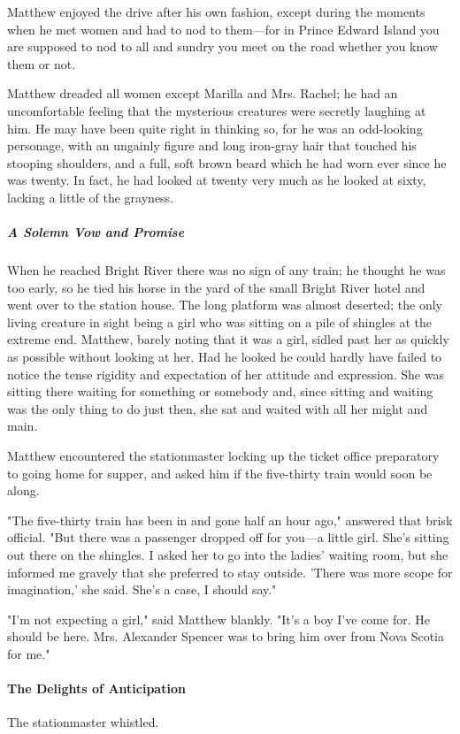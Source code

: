\documentclass{article}
\begin{document}
Matthew enjoyed the drive after his own fashion, except during the moments when he met women and had to nod to them---for in Prince Edward Island you are supposed to nod to all and sundry you meet on the road whether you know them or not.

Matthew dreaded all women except Marilla and Mrs. Rachel; he had an uncomfortable feeling that the mysterious creatures were secretly laughing at him. He may have been quite right in thinking so, for he was an odd-looking personage, with an ungainly figure and long iron-gray hair that touched his stooping shoulders, and a full, soft brown beard which he had worn ever since he was twenty. In fact, he had looked at twenty very much as he looked at sixty, lacking a little of the grayness.

\subparagraph{A Solemn Vow and Promise}
When he reached Bright River there was no sign of any train; he thought he was too early, so he tied his horse in the yard of the small Bright River hotel and went over to the station house. The long platform was almost deserted; the only living creature in sight being a girl who was sitting on a pile of shingles at the extreme end. Matthew, barely noting that it was a girl, sidled past her as quickly as possible without looking at her. Had he looked he could hardly have failed to notice the tense rigidity and expectation of her attitude and expression. She was sitting there waiting for something or somebody and, since sitting and waiting was the only thing to do just then, she sat and waited with all her might and main.

Matthew encountered the stationmaster locking up the ticket office preparatory to going home for supper, and asked him if the five-thirty train would soon be along.

"The five-thirty train has been in and gone half an hour ago," answered that brisk official. "But there was a passenger dropped off for you---a little girl. She's sitting out there on the shingles. I asked her to go into the ladies' waiting room, but she informed me gravely that she preferred to stay outside. 'There was more scope for imagination,' she said. She's a case, I should say."

"I'm not expecting a girl," said Matthew blankly. "It's a boy I've come for. He should be here. Mrs. Alexander Spencer was to bring him over from Nova Scotia for me."

\paragraph{The Delights of Anticipation}
The stationmaster whistled.
\end{document}
